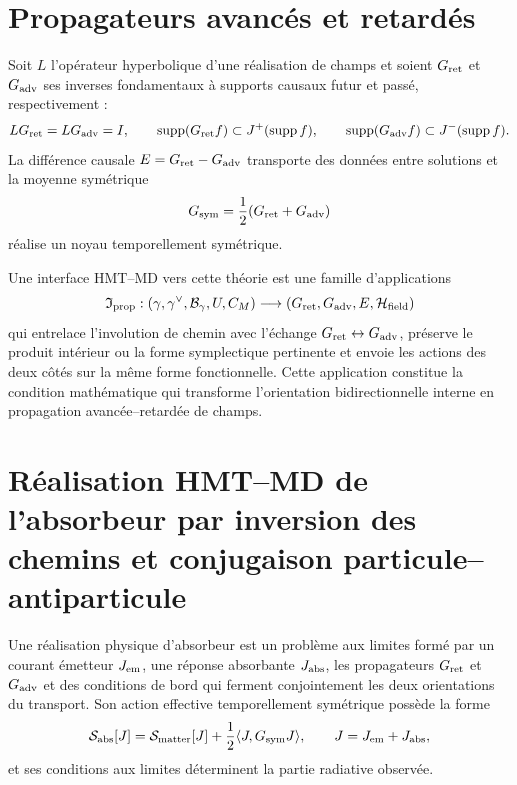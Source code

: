 \section{Propagateurs avancés et retardés}

Soit $L$ l'opérateur hyperbolique d'une réalisation de champs et soient
$G_{\rm ret}$ et $G_{\rm adv}$ ses inverses fondamentaux à supports
causaux futur et passé, respectivement :
\begin{equation}
 LG_{\rm ret}=LG_{\rm adv}=I,
 \qquad
 \operatorname{supp}(G_{\rm ret}f)\subset J^+(\operatorname{supp}f),
 \qquad
 \operatorname{supp}(G_{\rm adv}f)\subset J^-(\operatorname{supp}f).
 \label{eq:mt-green-avanzado-retardado}
\end{equation}
La différence causale
$E=G_{\rm ret}-G_{\rm adv}$ transporte des données entre solutions et la moyenne
symétrique
\[
 G_{\rm sym}=\frac12(G_{\rm ret}+G_{\rm adv})
\]
réalise un noyau temporellement symétrique.

Une interface HMT--MD vers cette théorie est une famille d'applications
\begin{equation}
 \mathfrak I_{\rm prop}:
 (\gamma,\gamma^\vee,\mathcal B_\gamma,U,C_M)
 \longrightarrow
 (G_{\rm ret},G_{\rm adv},E,\mathcal H_{\rm field})
 \label{eq:mt-interfaz-green}
\end{equation}
qui entrelace l'involution de chemin avec l'échange
$G_{\rm ret}\leftrightarrow G_{\rm adv}$, préserve le produit intérieur ou la
forme symplectique pertinente et envoie les actions des deux côtés sur la même
forme fonctionnelle. Cette application constitue la condition mathématique qui transforme
l'orientation bidirectionnelle interne en propagation avancée--retardée de
champs.

\section{Réalisation HMT–MD de l'absorbeur par inversion des chemins et conjugaison particule–antiparticule}

\begin{definicionnarrativa}[title={Système d'émission--absorption bidirectionnel}]
\label{def:mt-absorbedor}
Une réalisation physique d'absorbeur est un problème aux limites formé par
un courant émetteur $J_{\rm em}$, une réponse absorbante $J_{\rm abs}$,
les propagateurs $G_{\rm ret}$ et $G_{\rm adv}$ et des conditions de bord qui
ferment conjointement les deux orientations du transport. Son action
effective temporellement symétrique possède la forme
\begin{equation}
 \mathcal S_{\rm abs}[J]
 =\mathcal S_{\rm matter}[J]
 +\frac12\langle J,G_{\rm sym}J\rangle,
 \qquad J=J_{\rm em}+J_{\rm abs},
 \label{eq:mt-accion-absorbedor}
\end{equation}
et ses conditions aux limites déterminent la partie radiative observée.
\end{definicionnarrativa}


